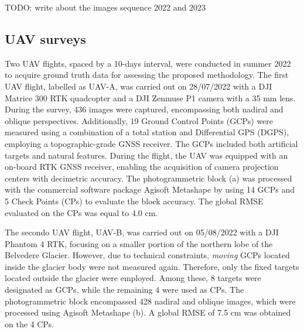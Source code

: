   {\color{red} TODO: write about the images sequence 2022 and 2023}

\subsection{UAV surveys}\label{sec:uavsurveys}

Two UAV flights, spaced by a 10-days interval, were conducted in summer 2022 to acquire
ground truth data for assessing the proposed methodology.
The first UAV flight, labelled as UAV-A, was carried out on 28/07/2022 with a DJI
Matrice 300 RTK quadcopter and a DJI Zenmuse P1 camera with a 35 mm lens.
During the survey, 436 images were captured, encompassing both nadiral and oblique
perspectives.
Additionally, 19 Ground Control Points (GCPs) were measured using a combination of a
total station and Differential GPS (DGPS), employing a topographic-grade
GNSS receiver.
The GCPs included both artificial targets and natural features.
During the flight, the UAV was equipped with an on-board RTK GNSS receiver, enabling the
acquisition of camera projection centers with decimetric accuracy.
The photogrammetric block (a) was processed with the commercial
software package Agisoft Metashape \citep{agisoft} by using 14 GCPs and 5 Check Points
(CPs) to evaluate the block accuracy.
The global RMSE evaluated on the CPs was equal to 4.0 cm.

The secondo UAV flight, UAV-B, was carried out on 05/08/2022 with a DJI Phantom
4 RTK, focusing on a smaller portion of the northern lobe of the Belvedere Glacier.
However, due to technical constraints, \textit{moving} GCPs located inside the
glacier body were not measured again.
Therefore, only the fixed targets located outside the glacier were employed.
Among these, 8 targets were designated as GCPs, while the remaining 4 were used as CPs.
The photogrammetric block encompassed 428 nadiral and oblique images, which
were processed using Agisoft Metashape (b).
A global RMSE of 7.5 cm was obtained on the 4 CPs.

